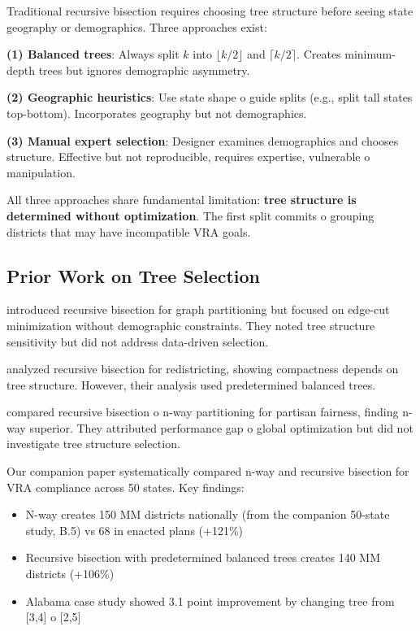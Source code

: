 Traditional recursive bisection requires choosing tree structure before seeing state geography or demographics. Three approaches exist:

\textbf{(1) Balanced trees}: Always split $k$ into $\lfloor k/2 \rfloor$ and $\lceil k/2 \rceil$. Creates minimum-depth trees but ignores demographic asymmetry.

\textbf{(2) Geographic heuristics}: Use state shape 	o guide splits (e.g., split tall states top-bottom). Incorporates geography but not demographics.

\textbf{(3) Manual expert selection}: Designer examines demographics and chooses structure. Effective but not reproducible, requires expertise, vulnerable 	o manipulation.

All three approaches share fundamental limitation: \textbf{tree structure is determined without optimization}. The first split commits 	o grouping districts that may have incompatible VRA goals.

\subsection{Prior Work on Tree Selection}

\citet{karypis1998} introduced recursive bisection for graph partitioning but focused on edge-cut minimization without demographic constraints. They noted tree structure sensitivity but did not address data-driven selection.

\citet{duchin2018} analyzed recursive bisection for redistricting, showing compactness depends on tree structure. However, their analysis used predetermined balanced trees.

\citet{autry2020} compared recursive bisection 	o n-way partitioning for partisan fairness, finding n-way superior. They attributed performance gap 	o global optimization but did not investigate tree structure selection.

Our companion paper \citep{dellaLibera2026nwayRecursive} systematically compared n-way and recursive bisection for VRA compliance across 50 states. Key findings:
\begin{itemize}
\item N-way creates 150 MM districts nationally (from the companion 50-state study, B.5) vs 68 in enacted plans (+121\%)
\item Recursive bisection with predetermined balanced trees creates 140 MM districts (+106\%)
\item Alabama case study showed 3.1 point improvement by changing tree from [3,4] 	o [2,5]
\end{itemize}

